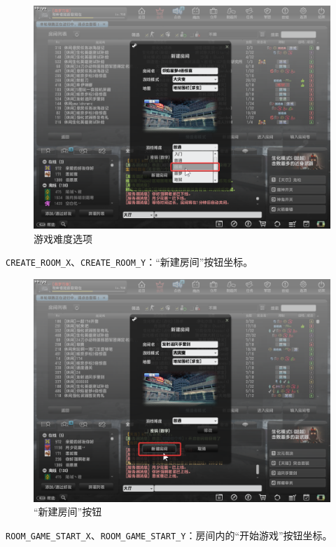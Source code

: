 \begin{figure}[H]
    \Centering
    \includegraphics[width=\textwidth]{docs/assets/difficulty_option.png}
    \caption{游戏难度选项}
\end{figure}

\lstinline{CREATE_ROOM_X}、\lstinline{CREATE_ROOM_Y}：“新建房间”按钮坐标。

\begin{figure}[H]
    \Centering
    \includegraphics[width=\textwidth]{docs/assets/create_room_1.png}
    \caption{“新建房间”按钮}
\end{figure}

\lstinline{ROOM_GAME_START_X}、\lstinline{ROOM_GAME_START_Y}：房间内的“开始游戏”按钮坐标。

